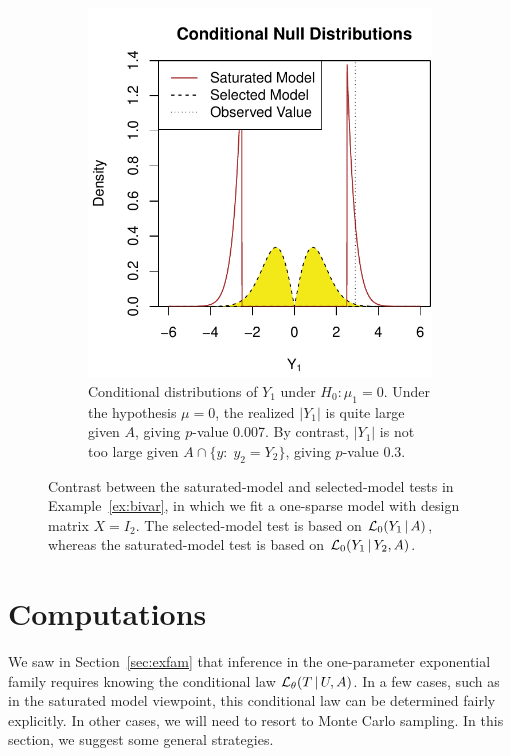 \documentclass{article}
\theoremstyle{definition}
\newcommand{\bX}{X}
\newcommand{\cL}{\mathcal{L}}
\begin{document}
\begin{figure}
\begin{subfigure}[t]{.4\textwidth}
    \includegraphics[width=\textwidth]{figs/fullvredNulls.pdf}
    \caption{ Conditional distributions of $Y_1$ under
      $H_0:\mu_1 = 0$. Under the hypothesis
      $\mu=0$, the realized  $|Y_1|$ is  quite large given $A$,
      giving  $p$-value 0.007. By contrast, $|Y_1|$ is not too large
      given $A \cap \{y:\; y_2=Y_2\}$, giving
      $p$-value 0.3.}
  \end{subfigure}
  \caption{Contrast between the saturated-model and selected-model tests
    in Example~\ref{ex:bivar}, in which we fit a one-sparse model with
    design matrix $\bX=I_2$. The selected-model test is based
    on  $\cL_0(Y_1 \gv A)$, whereas the saturated-model test is based
    on $\cL_0(Y_1  \gv  Y_2, A)$.}
  \label{fig:fullvred}
\end{figure}



\section{Computations}\label{sec:approxInt}

We saw in Section~\ref{sec:exfam} that inference in the one-parameter exponential family requires knowing the conditional law $\cL_\theta(T\gv U, A)$. In a few cases, such as in the saturated model viewpoint, this conditional law can be determined fairly explicitly. In other cases, we will need to resort to Monte Carlo sampling. In this section, we suggest some general strategies.
\end{document}
